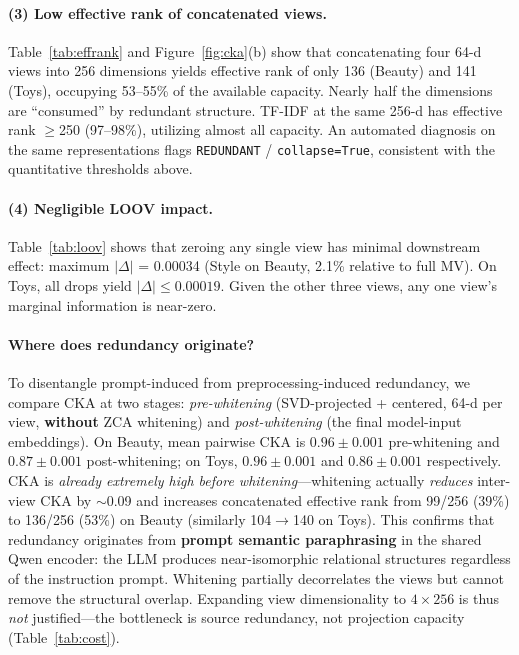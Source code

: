 \documentclass[sigconf,natbib=true,anonymous]{acmart}
\begin{document}
\paragraph{(3) Low effective rank of concatenated views.}
Table~\ref{tab:effrank} and Figure~\ref{fig:cka}(b) show that concatenating four 64-d views into 256 dimensions yields effective rank of only 136 (Beauty) and 141 (Toys), occupying 53--55\% of the available capacity.
Nearly half the dimensions are ``consumed'' by redundant structure.
TF-IDF at the same 256-d has effective rank $\ge$250 (97--98\%), utilizing almost all capacity.
An automated diagnosis on the same representations flags \texttt{REDUNDANT} / \texttt{collapse=True}, consistent with the quantitative thresholds above.

\paragraph{(4) Negligible LOOV impact.}
Table~\ref{tab:loov} shows that zeroing any single view has minimal downstream effect: maximum $|\Delta|$ = 0.00034 (Style on Beauty, 2.1\% relative to full MV).
On Toys, all drops yield $|\Delta| \le 0.00019$.
Given the other three views, any one view's marginal information is near-zero.

\paragraph{Where does redundancy originate?}
To disentangle prompt-induced from preprocessing-induced redundancy, we compare CKA at two stages: \emph{pre-whitening} (SVD-projected + centered, 64-d per view, \textbf{without} ZCA whitening) and \emph{post-whitening} (the final model-input embeddings).
On Beauty, mean pairwise CKA is $0.96\pm0.001$ pre-whitening and $0.87\pm0.001$ post-whitening; on Toys, $0.96\pm0.001$ and $0.86\pm0.001$ respectively.
CKA is \emph{already extremely high before whitening}---whitening actually \emph{reduces} inter-view CKA by $\sim$0.09 and increases concatenated effective rank from 99/256 (39\%) to 136/256 (53\%) on Beauty (similarly 104$\to$140 on Toys).
This confirms that redundancy originates from \textbf{prompt semantic paraphrasing} in the shared Qwen encoder: the LLM produces near-isomorphic relational structures regardless of the instruction prompt.
Whitening partially decorrelates the views but cannot remove the structural overlap.
Expanding view dimensionality to $4\times256$ is thus \emph{not} justified---the bottleneck is source redundancy, not projection capacity (Table~\ref{tab:cost}).
\end{document}
